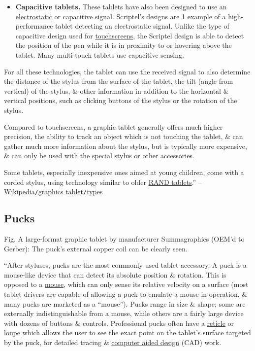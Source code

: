 \documentclass[oneside]{book}
\numberwithin{equation}{section}
\begin{document}
\begin{itemize}
	\item \textbf{Capacitive tablets.} These tablets have also been designed to use an \href{https://en.wikipedia.org/wiki/Electrostatics}{electrostatic} or capacitive signal. Scriptel's designs are 1 example of a high-performance tablet detecting an electrostatic signal. Unlike the type of capacitive design used for \href{https://en.wikipedia.org/wiki/Touchscreen}{touchscreens}, the Scriptel design is able to detect the position of the pen while it is in proximity to or hovering above the tablet. Many multi-touch tablets use capacitive sensing.
\end{itemize}
For all these technologies, the tablet can use the received signal to also determine the distance of the stylus from the surface of the tablet, the tilt (angle from vertical) of the stylus, \& other information in addition to the horizontal \& vertical positions, such as clicking buttons of the stylus or the rotation of the stylus.

Compared to touchscreens, a graphic tablet generally offers much higher precision, the ability to track an object which is not touching the tablet, \& can gather much more information about the stylus, but is typically more expensive, \& can only be used with the special stylus or other accessories.

Some tablets, especially inexpensive ones aimed at young children, come with a corded stylus, using technology similar to older \href{https://en.wikipedia.org/wiki/RAND_Tablet}{RAND tablets}.'' -- \href{https://en.wikipedia.org/wiki/Graphics_tablet#Types}{Wikipedia\texttt{/}graphics tablet\texttt{/}types}

\subsection{Pucks}
\textsf{Fig. A large-format graphic tablet by manufacturer Summagraphics (OEM'd to Gerber): The puck's external copper coil can be clearly seen.}

``After styluses, pucks are the most commonly used tablet accessory. A puck is a mouse-like device that can detect its absolute position \& rotation. This is opposed to a \href{https://en.wikipedia.org/wiki/Mouse_(computing)}{mouse}, which can only sense its relative velocity on a surface (most tablet drivers are capable of allowing a puck to emulate a mouse in operation, \& many pucks are marketed as a ``mouse''). Pucks range in size \& shape; some are externally indistinguishable from a mouse, while others are a fairly large device with dozens of buttons \& controls. Professional pucks often have a \href{https://en.wikipedia.org/wiki/Reticle}{reticle} or \href{https://en.wikipedia.org/wiki/Loupe}{loupe} which allows the user to see the exact point on the tablet's surface targeted by the puck, for detailed tracing \& \href{https://en.wikipedia.org/wiki/Computer_aided_design}{computer aided design} (CAD) work.
\end{document}
